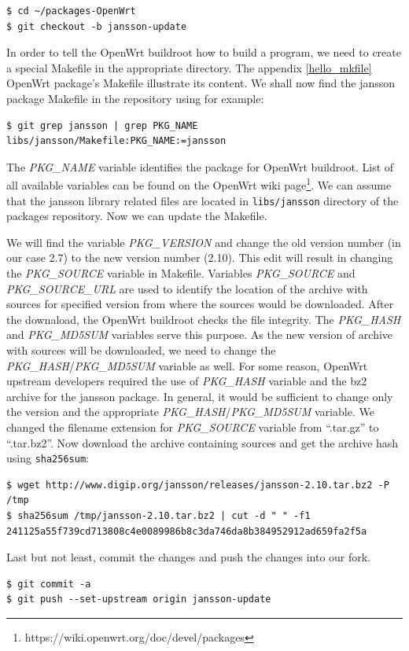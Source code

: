 \begin{lstlisting}[columns=fixed,basicstyle=\ttfamily\footnotesize,tabsize=4,backgroundcolor=\color{yellow!10}]
$ cd ~/packages-OpenWrt
$ git checkout -b jansson-update
\end{lstlisting}
In order to tell the OpenWrt buildroot how to build a program, we need to create a special Makefile in the appropriate directory.
The appendix \ref{hello_mkfile} OpenWrt package's Makefile illustrate its content.
We shall now find the jansson package Makefile in the repository using for example:
\begin{lstlisting}[columns=fixed,basicstyle=\ttfamily\footnotesize,tabsize=4,backgroundcolor=\color{yellow!10}]
$ git grep jansson | grep PKG_NAME
libs/jansson/Makefile:PKG_NAME:=jansson
\end{lstlisting}
The {\it PKG\_NAME} variable identifies the package for OpenWrt buildroot\cite{creating_pkgs}.
List of all available variables can be found on the OpenWrt wiki page\footnote{https://wiki.openwrt.org/doc/devel/packages}.
We can assume that the jansson library related files are located in {\tt libs/jansson} directory of the packages repository.
Now we can update the Makefile.

We will find the variable {\it PKG\_VERSION} and change the old version number (in our case 2.7) to the new version number (2.10).
This edit will result in changing the {\it PKG\_SOURCE} variable in Makefile.
Variables {\it PKG\_SOURCE} and {\it PKG\_SOURCE\_URL} are used to identify the location of the archive with sources for specified version from where the sources would be downloaded.
After the downaload, the OpenWrt buildroot checks the file integrity.
The {\it PKG\_HASH} and {\it PKG\_MD5SUM} variables serve this purpose.
As the new version of archive with sources will be downloaded, we need to change the {\it PKG\_HASH}/{\it PKG\_MD5SUM} variable as well.
For some reason, OpenWrt upstream developers required the use of {\it PKG\_HASH} variable and the bz2 archive for the jansson package.
In general, it would be sufficient to change only the version and the appropriate {\it PKG\_HASH}/{\it PKG\_MD5SUM} variable.
We changed the filename extension for {\it PKG\_SOURCE} variable from “.tar.gz” to “.tar.bz2”.
Now download the archive containing sources and get the archive hash using {\tt sha256sum}:
\begin{lstlisting}[columns=fixed,basicstyle=\ttfamily\footnotesize,tabsize=4,backgroundcolor=\color{yellow!10}]
$ wget http://www.digip.org/jansson/releases/jansson-2.10.tar.bz2 -P /tmp
$ sha256sum /tmp/jansson-2.10.tar.bz2 | cut -d " " -f1
241125a55f739cd713808c4e0089986b8c3da746da8b384952912ad659fa2f5a
\end{lstlisting}
Last but not least, commit the changes and push the changes into our fork.
\begin{lstlisting}[columns=fixed,basicstyle=\ttfamily\footnotesize,tabsize=4,backgroundcolor=\color{yellow!10}]
$ git commit -a
$ git push --set-upstream origin jansson-update
\end{lstlisting}

